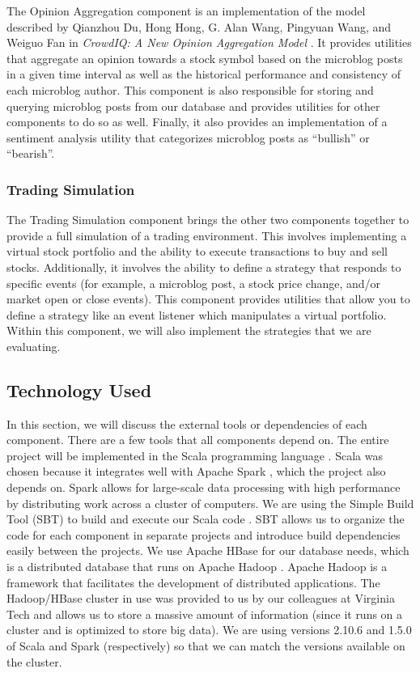 The Opinion Aggregation component is an implementation of the model described by Qianzhou Du, Hong Hong, G. Alan Wang, Pingyuan Wang, and Weiguo Fan in \textit{CrowdIQ: A New Opinion Aggregation Model} \cite{crowdiq}.
It provides utilities that aggregate an opinion towards a stock symbol based on the microblog posts in a given time interval as well as the historical performance and consistency of each microblog author.
This component is also responsible for storing and querying microblog posts from our database and provides utilities for other components to do so as well.
Finally, it also provides an implementation of a sentiment analysis utility that categorizes microblog posts as ``bullish'' or ``bearish''.

\subsubsection{Trading Simulation}

The Trading Simulation component brings the other two components together to provide a full simulation of a trading environment.
This involves implementing a virtual stock portfolio and the ability to execute transactions to buy and sell stocks.
Additionally, it involves the ability to define a strategy that responds to specific events (for example, a microblog post, a stock price change, and/or market open or close events).
This component provides utilities that allow you to define a strategy like an event listener which manipulates a virtual portfolio.
Within this component, we will also implement the strategies that we are evaluating.

\subsection{Technology Used}

In this section, we will discuss the external tools or dependencies of each component.
There are a few tools that all components depend on.
The entire project will be implemented in the Scala programming language \cite{scala}.
Scala was chosen because it integrates well with Apache Spark \cite{spark}, which the project also depends on.
Spark allows for large-scale data processing with high performance by distributing work across a cluster of computers.
We are using the Simple Build Tool (SBT) to build and execute our Scala code \cite{sbt}.
SBT allows us to organize the code for each component in separate projects and introduce build dependencies easily between the projects.
We use Apache HBase \cite{hbase} for our database needs, which is a distributed database that runs on Apache Hadoop \cite{hadoop}.
Apache Hadoop is a framework that facilitates the development of distributed applications.
The Hadoop/HBase cluster in use was provided to us by our colleagues at Virginia Tech and allows us to store a massive amount of information (since it runs on a cluster and is optimized to store big data).
We are using versions 2.10.6 and 1.5.0 of Scala and Spark (respectively) so that we can match the versions available on the cluster.

